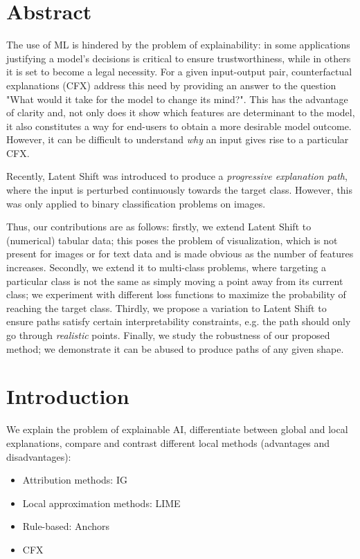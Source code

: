 \documentclass[../main.tex]{subfiles}
\begin{document}
\section{Abstract}

The use of ML is hindered by the problem of explainability: in some applications justifying a model's decisions is critical to ensure trustworthiness, while in others it is set to become a legal necessity.
For a given input-output pair, counterfactual explanations (CFX) address this need by providing an answer to the question "What would it take for the model to change its mind?".
This has the advantage of clarity and, not only does it show which features are determinant to the model, it also constitutes a way for end-users to obtain a more desirable model outcome. 
However, it can be difficult to understand \emph{why} an input gives rise to a particular CFX.

Recently, Latent Shift was introduced to produce a \emph{progressive explanation path}, where the input is perturbed continuously towards the target class. However, this was only applied to binary classification problems on images.

Thus, our contributions are as follows: firstly, we extend Latent Shift to (numerical) tabular data; this poses the problem of visualization, which is not present for images or for text data and is made obvious as the number of features increases.
Secondly, we extend it to multi-class problems, where targeting a particular class is not the same as simply moving a point away from its current class; we experiment with different loss functions to maximize the probability of reaching the target class.
Thirdly, we propose a variation to Latent Shift to ensure paths satisfy certain interpretability constraints, e.g. the path should only go through \emph{realistic} points.
Finally, we study the robustness of our proposed method; we demonstrate it can be abused to produce paths of any given shape.

\section{Introduction}

We explain the problem of explainable AI, differentiate between global and local explanations, compare and contrast different local methods (advantages and disadvantages):
\begin{itemize}
    \item Attribution methods: IG
    \item Local approximation methods: LIME
    \item Rule-based: Anchors
    \item CFX
\end{itemize}
 
\end{document}
